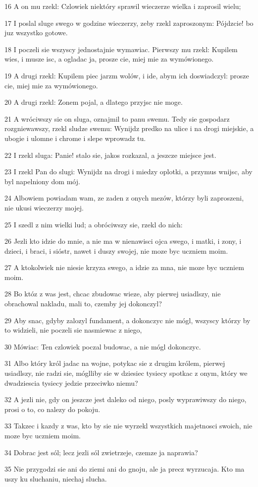 \par 16 A on mu rzekl: Czlowiek niektóry sprawil wieczerze wielka i zaprosil wielu;
\par 17 I poslal sluge swego w godzine wieczerzy, zeby rzekl zaproszonym: Pójdzcie! bo juz wszystko gotowe.
\par 18 I poczeli sie wszyscy jednostajnie wymawiac. Pierwszy mu rzekl: Kupilem wies, i musze isc, a ogladac ja, prosze cie, miej mie za wymówionego.
\par 19 A drugi rzekl: Kupilem piec jarzm wolów, i ide, abym ich doswiadczyl: prosze cie, miej mie za wymówionego.
\par 20 A drugi rzekl: Zonem pojal, a dlatego przyjsc nie moge.
\par 21 A wróciwszy sie on sluga, oznajmil to panu swemu. Tedy sie gospodarz rozgniewawszy, rzekl sludze swemu: Wynijdz predko na ulice i na drogi miejskie, a ubogie i ulomne i chrome i slepe wprowadz tu.
\par 22 I rzekl sluga: Panie! stalo sie, jakos rozkazal, a jeszcze miejsce jest.
\par 23 I rzekl Pan do slugi: Wynijdz na drogi i miedzy oplotki, a przymus wnijsc, aby byl napelniony dom mój.
\par 24 Albowiem powiadam wam, ze zaden z onych mezów, którzy byli zaproszeni, nie ukusi wieczerzy mojej.
\par 25 I szedl z nim wielki lud; a obróciwszy sie, rzekl do nich:
\par 26 Jezli kto idzie do mnie, a nie ma w nienawisci ojca swego, i matki, i zony, i dzieci, i braci, i sióstr, nawet i duszy swojej, nie moze byc uczniem moim.
\par 27 A ktokolwiek nie niesie krzyza swego, a idzie za mna, nie moze byc uczniem moim.
\par 28 Bo któz z was jest, chcac zbudowac wieze, aby pierwej usiadlszy, nie obrachowal nakladu, mali to, czemby jej dokonczyl?
\par 29 Aby snac, gdyby zalozyl fundament, a dokonczyc nie mógl, wszyscy którzy by to widzieli, nie poczeli sie nasmiewac z niego,
\par 30 Mówiac: Ten czlowiek poczal budowac, a nie mógl dokonczyc.
\par 31 Albo który król jadac na wojne, potykac sie z drugim królem, pierwej usiadlszy, nie radzi sie, móglliby sie w dziesiec tysiecy spotkac z onym, który we dwadziescia tysiecy jedzie przeciwko niemu?
\par 32 A jezli nie, gdy on jeszcze jest daleko od niego, posly wyprawiwszy do niego, prosi o to, co nalezy do pokoju.
\par 33 Takzec i kazdy z was, kto by sie nie wyrzekl wszystkich majetnosci swoich, nie moze byc uczniem moim.
\par 34 Dobrac jest sól; lecz jezli sól zwietrzeje, czemze ja naprawia?
\par 35 Nie przygodzi sie ani do ziemi ani do gnoju, ale ja precz wyrzucaja. Kto ma uszy ku sluchaniu, niechaj slucha.

